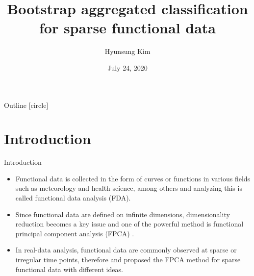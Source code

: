 \documentclass{beamer}
\title{Bootstrap aggregated classification for sparse functional data}
\date[Short Occasion]{July 24, 2020}
\author{Hyunsung Kim}
\institute[Deptartment of Statistics]
	{Department of Statistics\\
 	 Chung-Ang University}
\begin{document}
\begin{frame}
  \titlepage
\end{frame}

\begin{frame}{Outline}
	[circle]
	\tableofcontents
\end{frame}


\section{Introduction}

\begin{frame}{Introduction}
	\begin{itemize}
		\item{
			Functional data is collected in the form of curves or functions in various fields such as meteorology and health science, among others and analyzing this is called functional data analysis (FDA).
		}
		\item{
			Since functional data are defined on infinite dimensions, dimensionality reduction becomes a key issue and one of the powerful method is functional principal component analysis (FPCA) \citep{Silverman1996}.
		}
		\item{
			In real-data analysis, functional data are commonly observed at sparse or irregular time points, therefore \cite{James2000} and \cite{Yao2005} proposed the FPCA method for sparse functional data with different ideas.
		}
	\end{itemize}
\end{frame}
\end{document}
